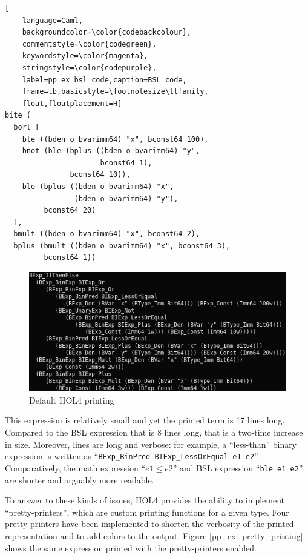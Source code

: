 \documentclass{kththesis}
\begin{document}
{\begin{lstlisting}[
    language=Caml,
    backgroundcolor=\color{codebackcolour},
    commentstyle=\color{codegreen},
    keywordstyle=\color{magenta},
    stringstyle=\color{codepurple},
    label=pp_ex_bsl_code,caption=BSL code,
    frame=tb,basicstyle=\footnotesize\ttfamily,
    float,floatplacement=H]
bite (
  borl [
    ble ((bden o bvarimm64) "x", bconst64 100),
    bnot (ble (bplus ((bden o bvarimm64) "y",
                      bconst64 1),
               bconst64 10)),
    ble (bplus ((bden o bvarimm64) "x",
                (bden o bvarimm64) "y"),
         bconst64 20)
  ],
  bmult ((bden o bvarimm64) "x", bconst64 2),
  bplus (bmult ((bden o bvarimm64) "x", bconst64 3),
         bconst64 1))
\end{lstlisting}

\begin{figure}[!h]
	\includegraphics[width=\textwidth]{figures/pp_ex_default_printing.png}
	\centering
	\caption{Default HOL4 printing}
	\label{pp_ex_default_printing}
\end{figure}

This expression is relatively small and yet the printed term is 17 lines long. Compared to the BSL expression that is 8 lines long\footnotemark, that is a two-time increase in size. Moreover, lines are long and verbose: for example, a ``less-than'' binary expression is written as ``\texttt{BExp\_BinPred BIExp\_LessOrEqual e1 e2}''. Comparatively, the math expression ``$e1 \leq e2$'' and BSL expression ``\texttt{ble e1 e2}'' are shorter and arguably more readable.


To answer to these kinds of issues, HOL4 provides the ability to implement ``pretty-printers'', which are custom printing functions for a given type. Four pretty-printers have been implemented to shorten the verbosity of the printed representation and to add colors to the output. Figure \ref{pp_ex_pretty_printing} shows the same expression printed with the pretty-printers enabled.

}
\end{document}
